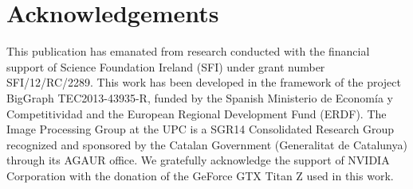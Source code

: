 \documentclass[10pt,twocolumn,letterpaper]{article}
\begin{document}
\section*{Acknowledgements}\label{sec:acknowledgements}

This publication has emanated from research conducted with the financial support of Science Foundation Ireland (SFI) under grant number SFI/12/RC/2289.
This work has been developed in the framework of the project BigGraph TEC2013-43935-R, funded by the Spanish Ministerio de Econom\'ia y Competitividad and the European Regional Development Fund (ERDF). 
The Image Processing Group at the UPC is a SGR14 Consolidated Research Group recognized and sponsored by the Catalan Government (Generalitat de Catalunya) through its  AGAUR office.
We gratefully acknowledge the support of NVIDIA Corporation with the donation of the GeForce GTX Titan Z used in this work.

{\small


}
\end{document}
